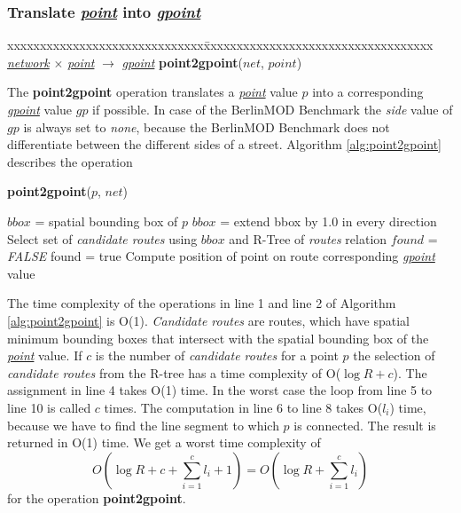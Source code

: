 \documentclass[a4paper]{article}
\newcommand{\bmodb} {BerlinMOD Benchmark}
\newcommand{\op}[1]{\textbf{#1}}
\newcommand{\dt}[1]{\textsl{\underline{#1}}}
\newcommand{\false}{\textsl{FALSE}}
\begin{document}
\subsubsection{Translate \dt{point} into \dt{gpoint}}
\begin{tabbing}
xxxxxxxxxxxxxxxxxxxxxxxxxxxxxx\=xxxxxxxxxxxxxxxxxxxxxxxxxxxxxxxxxxx\kill
\dt{network} $\times$ \dt{point} $\rightarrow$ \dt{gpoint} \>
\op{point2gpoint}($net$, $point$)\\
\end{tabbing}
The \op{point2gpoint} operation translates a \dt{point} value $p$ into a
corresponding \dt{gpoint} value $gp$ if possible. In case of
the \bmodb{} the \textit{side} value of $gp$ is always set to \textit{none}, because the
\bmodb{} does not differentiate between the different sides of a street. Algorithm
\ref{alg:point2gpoint} describes the operation
\begin{algorithm}[H]
  \caption{\op{point2gpoint}($p$, $net$)}
  \label{alg:point2gpoint}
  \begin{algorithmic}[1]
    \STATE $bbox$ = spatial bounding box of $p$
    \STATE $bbox$ = extend bbox by 1.0 in every direction
    \STATE Select set of \textit{candidate routes} using $bbox$ and R-Tree of \textit{routes}
relation
    \STATE $found$ = \false{}
        \STATE found = true
        \STATE Compute position of point on route
      \ENDIF
    \ENDWHILE
    \RETURN corresponding \dt{gpoint} value
  \end{algorithmic}
\end{algorithm}
The time complexity of the operations in line 1 and line 2 of Algorithm
\ref{alg:point2gpoint} is O(1).
\textit{Candidate routes} are routes, which have spatial minimum bounding boxes
that intersect with the spatial bounding box of the \dt{point} value.
If $c$ is the number of \textit{candidate routes} for a point $p$ the selection of
\textit{candidate routes} from the R-tree has a time complexity of O($\log R + c$).
The assignment in line 4 takes O(1) time.
In the worst case the loop from line 5 to line 10 is called $c$ times.
The computation in line 6 to line 8 takes O($l_i$) time, because
we have to find the line segment to which $p$ is connected.
The result is returned in O(1) time. We get a worst time complexity of
\[O(\log R + c + \sum_{i=1}^{c}{l_i} + 1) = O(\log R + \sum_{i=1}^{c}{l_i})\]
for the operation \op{point2gpoint}.
\end{document}
